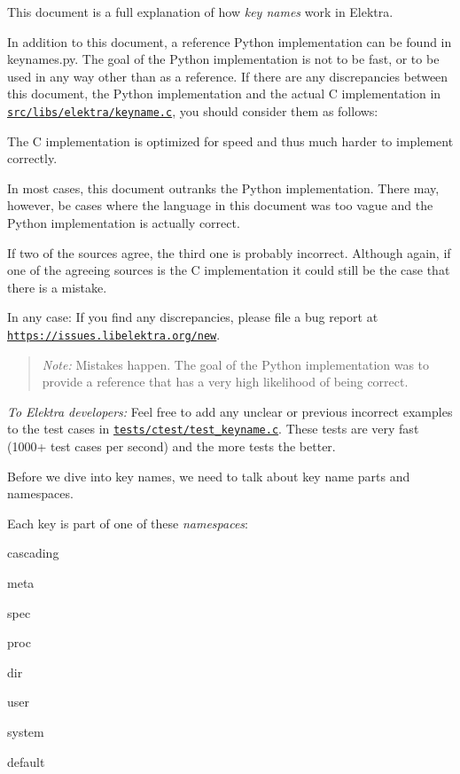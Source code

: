 This document is a full explanation of how {\itshape key names} work in Elektra.

In addition to this document, a reference Python implementation can be found in keynames.py. The goal of the Python implementation is not to be fast, or to be used in any way other than as a reference. If there are any discrepancies between this document, the Python implementation and the actual C implementation in \href{/home/jenkins/workspace/libelektra-release/src/libs/elektra/keyname.c}{\tt src/libs/elektra/keyname.\+c}, you should consider them as follows\+:


\begin{DoxyEnumerate}
\item The C implementation is optimized for speed and thus much harder to implement correctly.
\item In most cases, this document outranks the Python implementation. There may, however, be cases where the language in this document was too vague and the Python implementation is actually correct.
\item If two of the sources agree, the third one is probably incorrect. Although again, if one of the agreeing sources is the C implementation it could still be the case that there is a mistake.
\end{DoxyEnumerate}

In any case\+: If you find any discrepancies, please file a bug report at \href{https://issues.libelektra.org/new}{\tt https\+://issues.\+libelektra.\+org/new}.

\begin{quote}
{\itshape Note\+:} Mistakes happen. The goal of the Python implementation was to provide a reference that has a very high likelihood of being correct. \end{quote}


{\itshape To Elektra developers\+:} Feel free to add any unclear or previous incorrect examples to the test cases in \href{/home/jenkins/workspace/libelektra-release/tests/ctest/test_keyname.c}{\tt tests/ctest/test\+\_\+keyname.\+c}. These tests are very fast (1000+ test cases per second) and the more tests the better.

Before we dive into key names, we need to talk about key name parts and namespaces.

Each key is part of one of these {\itshape namespaces}\+:


\begin{DoxyItemize}
\item cascading
\item meta
\item spec
\item proc
\item dir
\item user
\item system
\item default
\end{DoxyItemize}

